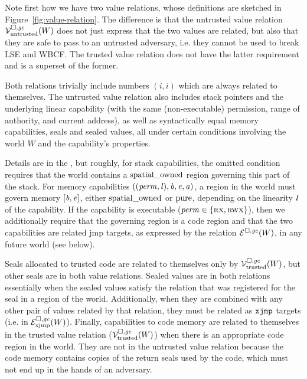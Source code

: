 Note first how we have two value relations, whose definitions are sketched in Figure~\ref{fig:value-relation}.
The difference is that the untrusted value relation $\mathcal{V}^{\square,\mathit{gc}}_{\mathrm{untrusted}}(W)$ does not just express that the two values are related, but also that they are safe to pass to an untrusted adversary, i.e. they cannot be used to break LSE and WBCF.
The trusted value relation does not have the latter requirement and is a superset of the former.

Both relations trivially include numbers $(i,i)$ which are always related to themselves.
The untrusted value relation also includes stack pointers and the underlying linear capability (with the same (non-executable) permission, range of authority, and current address), as well as syntactically equal memory capabilities, seals and sealed values, all under certain conditions involving the world $W$ and the capability's properties.

Details are in the \cite{technical_report}, but roughly, for stack capabilities, the omitted condition requires that the world contains a $\mathrm{spatial\_owned}$ region governing this part of the stack.
For memory capabilities $((\mathit{perm},\mathit{l}),\mathit{b},\mathit{e},\mathit{a})$, a region in the world must govern memory $[\mathit{b},\mathit{e}]$, either $\mathrm{spatial\_owned}$ or $\mathrm{pure}$, depending on the linearity $\mathit{l}$ of the capability.
If the capability is executable ($\mathit{perm} \in \{\textsc{rx},\textsc{rwx}\}$), then we additionally require that the governing region is a code region and that the two capabilities are related $\mathrm{jmp}$ targets, as expressed by the relation $\mathcal{E}^{\square,\mathit{gc}}(W)$, in any future world (see below).

Seals allocated to trusted code are related to themselves only by $\mathcal{V}^{\square,\mathit{gc}}_{\mathrm{trusted}}(W)$, but other seals are in both value relations.
Sealed values are in both relations essentially when the sealed values satisfy the relation that was registered for the seal in a region of the world.
Additionally, when they are combined with any other pair of values related by that relation, they must be related as $\txjmp{}{}$ targets (i.e. in $\mathcal{E}^{\square,\mathit{gc}}_{\mathrm{xjmp}}(W)$).
Finally, capabilities to code memory are related to themselves in the trusted value relation ($\mathcal{V}^{\square,\mathit{gc}}_{\mathrm{trusted}}(W)$) when there is an appropriate code region in the world.
They are not in the untrusted value relation because the code memory contains copies of the return seals used by the code, which must not end up in the hands of an adversary.

